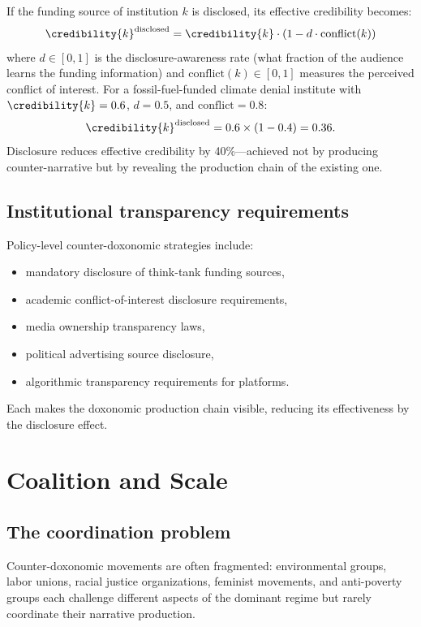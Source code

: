 \begin{proposition}
\label{prop:disclosure}
If the funding source of institution $k$ is disclosed, its effective credibility becomes:
\[
  \credibility{k}^{\text{disclosed}} = \credibility{k} \cdot (1 - d \cdot \text{conflict}(k))
\]
where $d \in [0, 1]$ is the disclosure-awareness rate (what fraction of the audience learns the funding information) and $\text{conflict}(k) \in [0, 1]$ measures the perceived conflict of interest.
For a fossil-fuel-funded climate denial institute with $\credibility{k} = 0.6$, $d = 0.5$, and $\text{conflict} = 0.8$:
\[
  \credibility{k}^{\text{disclosed}} = 0.6 \times (1 - 0.4) = 0.36.
\]
Disclosure reduces effective credibility by 40\%---achieved not by producing counter-narrative but by revealing the production chain of the existing one.
\end{proposition}

\subsection{Institutional transparency requirements}

Policy-level counter-doxonomic strategies include:
\begin{itemize}[nosep]
  \item mandatory disclosure of think-tank funding sources,
  \item academic conflict-of-interest disclosure requirements,
  \item media ownership transparency laws,
  \item political advertising source disclosure,
  \item algorithmic transparency requirements for platforms.
\end{itemize}

Each makes the doxonomic production chain visible, reducing its effectiveness by the disclosure effect.

\section{Coalition and Scale}
\label{sec:ch31-coalition}

\subsection{The coordination problem}

Counter-doxonomic movements are often fragmented: environmental groups, labor unions, racial justice organizations, feminist movements, and anti-poverty groups each challenge different aspects of the dominant regime but rarely coordinate their narrative production.

